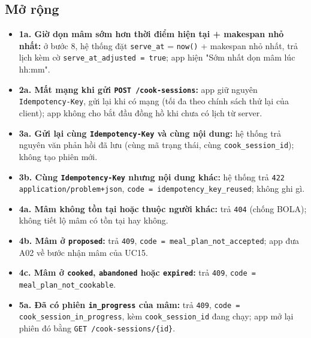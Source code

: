 \subsection{Mở rộng}
\begin{itemize}
\item \textbf{1a. Giờ dọn mâm sớm hơn thời điểm hiện tại + makespan nhỏ nhất:} ở bước 8, hệ thống đặt {\small\texttt{serve\_\allowbreak{}\allowbreak{}at}} = {\small\texttt{now()}} + makespan nhỏ nhất, trả lịch kèm cờ {\small\texttt{serve\_\allowbreak{}\allowbreak{}at\_\allowbreak{}\allowbreak{}adjusted = true}}; app hiện "Sớm nhất dọn mâm lúc hh:mm".
\item \textbf{2a. Mất mạng khi gửi {\small\texttt{POST /\allowbreak{}\allowbreak{}cook-\allowbreak{}sessions}}:} app giữ nguyên {\small\texttt{Idempotency-\allowbreak{}Key}}, gửi lại khi có mạng (tối đa theo chính sách thử lại của client); app không cho bắt đầu đồng hồ khi chưa có lịch từ server.
\item \textbf{3a. Gửi lại cùng {\small\texttt{Idempotency-\allowbreak{}Key}} và cùng nội dung:} hệ thống trả nguyên văn phản hồi đã lưu (cùng mã trạng thái, cùng {\small\texttt{cook\_\allowbreak{}\allowbreak{}session\_\allowbreak{}\allowbreak{}id}}); không tạo phiên mới.
\item \textbf{3b. Cùng {\small\texttt{Idempotency-\allowbreak{}Key}} nhưng nội dung khác:} hệ thống trả {\small\texttt{422}} {\small\texttt{application/\allowbreak{}\allowbreak{}problem+json}}, {\small\texttt{code = idempotency\_\allowbreak{}\allowbreak{}key\_\allowbreak{}\allowbreak{}reused}}; không ghi gì.
\item \textbf{4a. Mâm không tồn tại hoặc thuộc người khác:} trả {\small\texttt{404}} (chống BOLA); không tiết lộ mâm có tồn tại hay không.
\item \textbf{4b. Mâm ở {\small\texttt{proposed}}:} trả {\small\texttt{409}}, {\small\texttt{code = meal\_\allowbreak{}\allowbreak{}plan\_\allowbreak{}\allowbreak{}not\_\allowbreak{}\allowbreak{}accepted}}; app đưa A02 về bước nhận mâm của UC15.
\item \textbf{4c. Mâm ở {\small\texttt{cooked}}, {\small\texttt{abandoned}} hoặc {\small\texttt{expired}}:} trả {\small\texttt{409}}, {\small\texttt{code = meal\_\allowbreak{}\allowbreak{}plan\_\allowbreak{}\allowbreak{}not\_\allowbreak{}\allowbreak{}cookable}}.
\item \textbf{5a. Đã có phiên {\small\texttt{in\_\allowbreak{}\allowbreak{}progress}} của mâm:} trả {\small\texttt{409}}, {\small\texttt{code = cook\_\allowbreak{}\allowbreak{}session\_\allowbreak{}\allowbreak{}in\_\allowbreak{}\allowbreak{}progress}}, kèm {\small\texttt{cook\_\allowbreak{}\allowbreak{}session\_\allowbreak{}\allowbreak{}id}} đang chạy; app mở lại phiên đó bằng {\small\texttt{GET /\allowbreak{}\allowbreak{}cook-\allowbreak{}sessions/\allowbreak{}\allowbreak{}\{id\}}}.

\end{itemize}
